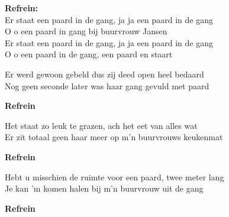 \textbf{Refrein:}\\
Er staat een paard in de gang, ja ja een paard in de gang\\
O o een paard in gang bij buurvrouw Jansen\\
Er staat een paard in de gang, ja ja een paard in de gang\\
O o een paard in de gang, een paard en staart

Er werd gewoon gebeld dus zij deed open heel bedaard\\
Nog geen seconde later was haar gang gevuld met paard

\textbf{Refrein}

Het staat zo leuk te grazen, ach het eet van alles wat\\
Er zit totaal geen haar meer op m'n buurvrouws keukenmat

\textbf{Refrein}

Hebt u misschien de ruimte voor een paard, twee meter lang\\
Je kan 'm komen halen bij m'n buurvrouw uit de gang

\textbf{Refrein}
